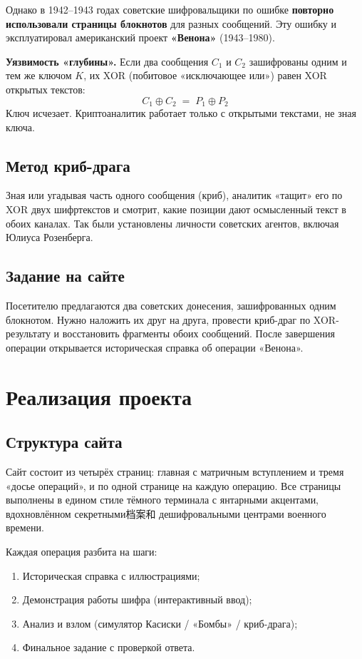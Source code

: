 \documentclass[12pt, a4paper]{article}
\makeatletter
\newenvironment{factbox}{%
  \vspace{4pt}\begin{lrbox}{\@tempboxa}\begin{minipage}{0.93\textwidth}%
  \setlength{\parskip}{5pt}\small
}{%
  \end{minipage}\end{lrbox}%
  \fcolorbox{amber}{blockbg}{\usebox{\@tempboxa}}\vspace{4pt}
}
\makeatother
\begin{document}
Однако в 1942--1943 годах советские шифровальщики по ошибке \textbf{повторно
использовали страницы блокнотов} для разных сообщений. Эту ошибку и
эксплуатировал американский проект \textbf{«Венона»} (1943--1980).

\begin{factbox}
\textbf{Уязвимость «глубины».} Если два сообщения $C_1$ и $C_2$ зашифрованы
одним и тем же ключом $K$, их XOR (побитовое «исключающее или») равен XOR
открытых текстов:
\[
  C_1 \oplus C_2 \;=\; P_1 \oplus P_2
\]
Ключ исчезает. Криптоаналитик работает только с открытыми текстами, не зная
ключа.
\end{factbox}

\subsection{Метод криб-драга}

Зная или угадывая часть одного сообщения (криб), аналитик «тащит» его по
XOR двух шифртекстов и смотрит, какие позиции дают осмысленный текст в
обоих каналах. Так были установлены личности советских агентов, включая
Юлиуса Розенберга.

\subsection{Задание на сайте}

Посетителю предлагаются два советских донесения, зашифрованных одним блокнотом.
Нужно наложить их друг на друга, провести криб-драг по XOR-результату и
восстановить фрагменты обоих сообщений. После завершения операции
открывается историческая справка об операции «Венона».

\section{Реализация проекта}

\subsection{Структура сайта}

Сайт состоит из четырёх страниц: главная с матричным вступлением и тремя
«досье операций», и по одной странице на каждую операцию. Все страницы
выполнены в едином стиле тёмного терминала с янтарными акцентами,
вдохновлённом секретными档案和 дешифровальными центрами военного времени.

Каждая операция разбита на шаги:
\begin{enumerate}[leftmargin=1.5cm, itemsep=2pt]
  \item Историческая справка с иллюстрациями;
  \item Демонстрация работы шифра (интерактивный ввод);
  \item Анализ и взлом (симулятор Касиски / «Бомбы» / криб-драга);
  \item Финальное задание с проверкой ответа.
\end{enumerate}
\end{document}
